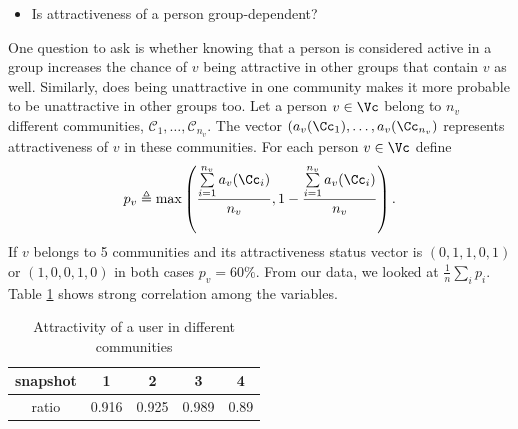 \begin{itemize}
\item Is attractiveness of a person group-dependent?
\end{itemize}

One question to ask is whether knowing that a person is considered active in a group increases the chance of $v$ being attractive in other groups that contain $v$ as well. Similarly, does being unattractive in one community makes it more probable to be unattractive in other groups too. Let a person $v\in\Vc$ belong to $n_v$ different communities, $\mathcal{C}_1,\ldots,\mathcal{C}_{n_v}$. The vector  $(a_v(\Cc_1),\ldots,a_v(\Cc_{n_v})$ represents attractiveness of $v$ in these communities. For each person $v\in\Vc$ define 
\begin{align}
p_v\triangleq\max\left(\frac{\sum\limits_{i=1}^{n_v} a_v(\Cc_i)}{n_v},1-\frac{\sum\limits_{i=1}^{n_v} a_v(\Cc_i)}{n_v}\right).
\end{align}
If $v$ belongs to 5 communities and its attractiveness status vector is $(0,1,1,0,1)$  or $(1,0,0,1,0)$ in both cases $p_v=60\%$. From our data, we looked at  $\frac{1}{n}\sum_i p_i  $. Table \ref{table:glob} shows strong correlation among the variables.

\begin{table}[htdp]
\caption{Attractivity of a user in different communities}
\begin{center}
\begin{tabular}{|c|c|c|c|c|}\hline
snapshot & 1 & 2 & 3 & 4  \\ \hline
ratio  & 0.916 & 0.925 & 0.989 & 0.89 \\ \hline
\end{tabular}
\end{center}
\label{table:glob}
\end{table}%



